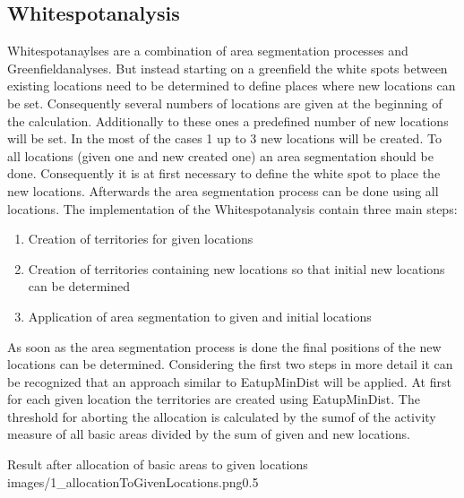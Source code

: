 \subsection{Whitespotanalysis}

Whitespotanaylses are a combination of area segmentation processes and Greenfieldanalyses. But instead starting on a greenfield the white spots between existing locations need to be determined to define places where new locations can be set. Consequently several numbers of locations are given at the beginning of the calculation. Additionally to these ones a predefined number of new locations will be set. In the most of the cases 1 up to 3 new locations will be created. To all locations (given one and new created one) an area segmentation should be done. Consequently it is at first necessary to define the white spot to place the new locations. Afterwards the area segmentation process can be done using all locations. The implementation of the Whitespotanalysis contain three main steps:

\begin{enumerate}
	\item Creation of territories for given locations
	\item Creation of territories containing new locations so that initial new locations can be determined
	\item Application of area segmentation to given and initial locations
\end{enumerate}

As soon as the area segmentation process is done the final positions of the new locations can be determined. Considering the first two steps in more detail it can be recognized that an approach similar to EatupMinDist will be applied. At first for each given location the territories are created using EatupMinDist. The threshold for aborting the allocation is calculated by the sumof of the activity measure of all basic areas divided by the sum of given and new locations.

\begin{figurevarSize}{Result after allocation of basic areas to given locations }{images/1_allocationToGivenLocations.png}{0.5}\end{figurevarSize}

